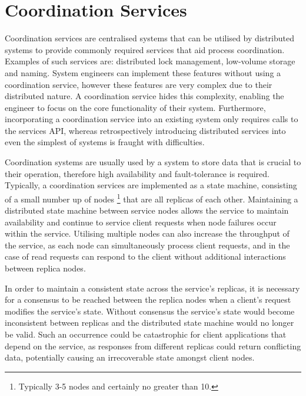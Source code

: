 \section{Coordination Services}\label{sec:coordination}
Coordination services are centralised systems that can be utilised by distributed systems to provide commonly required services that aid process coordination. Examples of such services are: distributed lock management, low-volume storage and naming. System engineers can implement these features without using a coordination service, however these features are very complex due to their distributed nature\citep{Burrows:2006:CLS:1298455.1298487}. A coordination service hides this complexity, enabling the engineer to focus on the core functionality of their system. Furthermore, incorporating a coordination service into an existing system only requires calls to the services API, whereas retrospectively introducing distributed services into even the simplest of systems is fraught with difficulties. 

Coordination systems are usually used by a system to store data that is crucial to their operation, therefore high availability and fault-tolerance is required. Typically, a coordination services are implemented as a state machine, consisting of a small number up of nodes \footnote{Typically 3-5 nodes and certainly no greater than 10.} that are all replicas of each other.  Maintaining a distributed state machine between service nodes allows the service to maintain availability and continue to service client requests when node failures occur within the service. Utilising multiple nodes can also increase the throughput of the service, as each node can simultaneously process client requests, and in the case of read requests can respond to the client without additional interactions between replica nodes.  

In order to maintain a consistent state across the service's replicas, it is necessary for a consensus to be reached between the replica nodes when a client's request modifies the service's state.  Without consensus the service's state would become inconsistent between replicas and the distributed state machine would no longer be valid.  Such an occurrence could be catastrophic for client applications that depend on the service, as responses from different replicas could return conflicting data, potentially causing an irrecoverable state amongst client nodes.  

